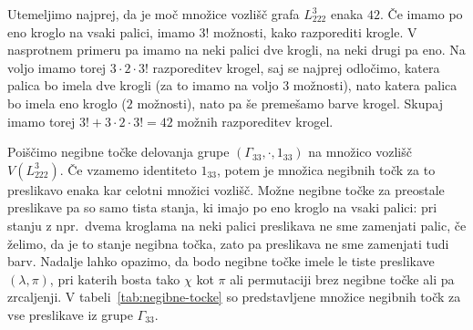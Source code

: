 \documentclass[12pt,a4paper]{amsart}
\theoremstyle{definition} %
\theoremstyle{plain} %
\begin{document}
    Utemeljimo najprej, da je moč množice vozlišč grafa $L_{222}^3$ enaka $42$. Če imamo po eno kroglo na vsaki palici, imamo $3!$ možnosti, kako razporediti krogle.
    V nasprotnem primeru pa imamo na neki palici dve krogli, na neki drugi pa eno. Na voljo imamo torej $3 \cdot 2 \cdot 3!$ razporeditev krogel, saj se najprej odločimo, katera palica bo imela dve krogli (za to imamo na voljo $3$ možnosti), nato katera palica bo imela eno kroglo ($2$ možnosti), nato pa še premešamo barve krogel. Skupaj imamo torej $3! + 3 \cdot 2 \cdot 3! = 42$ možnih razporeditev krogel.

    Poiščimo negibne točke delovanja grupe $ (\Gamma_{33}, \cdot,1_{33} ) $ na množico vozlišč $V(L_{222}^3)$. Če vzamemo identiteto $1_{33}$, potem je množica negibnih točk za to preslikavo enaka kar celotni množici vozlišč. 
    Možne negibne točke za preostale preslikave pa so samo tista stanja, ki imajo po eno kroglo na vsaki palici: pri stanju z npr.\ dvema kroglama na neki palici preslikava ne sme zamenjati palic, če želimo, da je to stanje negibna točka, zato pa preslikava ne sme zamenjati tudi barv.
    Nadalje lahko opazimo, da bodo negibne točke imele le tiste preslikave $(\lambda, \pi)$, pri katerih bosta tako $\chi$ kot $\pi$ ali permutaciji brez negibne točke ali pa zrcaljenji. V tabeli~\ref{tab:negibne-tocke} so predstavljene množice negibnih točk za vse preslikave iz grupe $\Gamma_{33}$.
    
\end{document}
